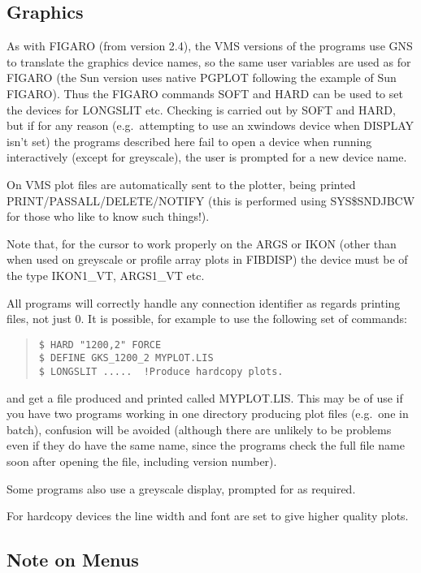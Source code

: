 \subsection{Graphics}

As with FIGARO (from version 2.4), the VMS versions of the
programs use GNS to translate the
graphics device names, so the same user variables are used as for
FIGARO (the Sun version uses native PGPLOT following the example of
Sun FIGARO).
Thus the FIGARO commands SOFT and HARD can be used to set the devices
for LONGSLIT etc.
Checking is carried out by SOFT and HARD, but if for any reason
(e.g.\ attempting to use an xwindows device when DISPLAY isn't set)
the programs described here fail to open a device when running
interactively (except for greyscale), the user is prompted for a new
device name.

On VMS plot files are automatically sent to the plotter, being printed
PRINT/PASSALL/DELETE/NOTIFY (this is performed using SYS\$SNDJBCW for
those who like to know such things!).

Note that, for the cursor to work properly on the ARGS or IKON (other
than when used on greyscale or profile array plots in FIBDISP) the
device must be of the type IKON1\_VT, ARGS1\_VT etc.

All programs will correctly handle any connection identifier as regards
printing files, not just 0.
It is possible, for example to use the following set of commands:
\begin{quote}\begin{verbatim}
$ HARD "1200,2" FORCE
$ DEFINE GKS_1200_2 MYPLOT.LIS
$ LONGSLIT .....  !Produce hardcopy plots.
\end{verbatim}\end{quote}
 and get a file produced and printed called MYPLOT.LIS.
This may be of use if you have two programs working in one directory
producing plot files (e.g.\ one in batch), confusion will be avoided
(although there are unlikely to be problems even if they do have the
same name, since the programs check the full file name soon after
opening the file, including version number).

Some programs also use a greyscale display, prompted for as required.

For hardcopy devices the line width and font are set to give higher
quality plots.

\subsection{Note on Menus}

